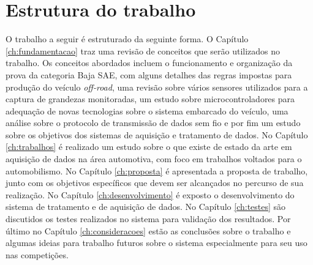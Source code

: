 \section{Estrutura do trabalho}

O trabalho a seguir é estruturado da seguinte forma. O Capítulo \ref{ch:fundamentacao} traz uma revisão de conceitos que serão utilizados no trabalho. Os conceitos abordados incluem o funcionamento e organização da prova da categoria Baja SAE, com alguns detalhes das regras impostas para produção do veículo \textit{off-road}, uma revisão sobre vários sensores utilizados para a captura de grandezas monitoradas, um estudo sobre microcontroladores para adequação de novas tecnologias sobre o sistema embarcado do veículo, uma análise sobre o protocolo de transmissão de dados sem fio e por fim um estudo sobre os objetivos dos sistemas de aquisição e tratamento de dados. No Capítulo \ref{ch:trabalhos} é realizado um estudo sobre o que existe de estado da arte em aquisição de dados na área automotiva, com foco em trabalhos voltados para o automobilismo. No Capítulo \ref{ch:proposta} é apresentada a proposta de trabalho, junto com os objetivos específicos que devem ser alcançados no percurso de sua realização. No Capítulo \ref{ch:desenvolvimento} é exposto o desenvolvimento do sistema de tratamento e de aquisição de dados. No Capítulo \ref{ch:testes} são discutidos os testes realizados no sistema para validação dos resultados. Por último no Capítulo \ref{ch:consideracoes} estão as conclusões sobre o trabalho e algumas ideias para trabalho futuros sobre o sistema especialmente para seu uso nas competições.  
